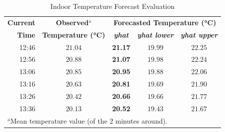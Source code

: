 \documentclass[conference]{IEEEtran}
\begin{document}
\begin{table}[htbp]
    \caption{Indoor Temperature Forecast Evaluation}
    \begin{center}
        \begin{tabular}{|r||c||c|c|c|}
            \hline
            \textbf{Current} & \textbf{Observed}$^{\mathrm{a}}$ & \multicolumn{3}{|c|}{\textbf{Forecasted Temperature (°C)}} \\
            \cline{3-5}
            \textbf{Time} & \textbf{Temperature (°C)} & \textbf{\textit{yhat}} & \textbf{\textit{yhat lower}} & \textbf{\textit{yhat upper}} \\
            \hline
            \hline
            12:46 & $21.04$ & \textbf{21.17} & $19.99$ & $22.25$ \\
            \hline
            12:56 & $20.88$ & \textbf{21.07} & $19.98$ & $22.24$ \\
            \hline
            13:06 & $20.85$ & \textbf{20.95} & $19.88$ & $22.06$ \\
            \hline
            13:16 & $20.63$ & \textbf{20.81} & $19.69$ & $21.90$ \\
            \hline
            13:26 & $20.42$ & \textbf{20.66} & $19.66$ & $21.77$ \\
            \hline
            13:36 & $20.13$ & \textbf{20.52} & $19.43$ & $21.67$ \\
            \hline
            \multicolumn{4}{l}{$^{\mathrm{a}}$Mean temperature value (of the 2 minutes around).}
        \end{tabular}
        \label{tab_forecast_indoor}
    \end{center}
\end{table}
\end{document}
